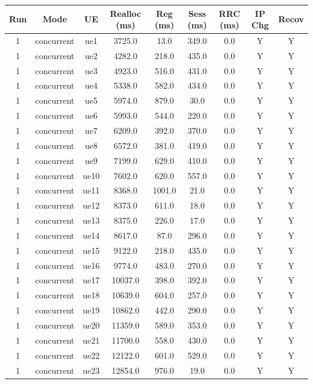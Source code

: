 \begin{table}[ht]
\centering
\begin{tabular}{|c|c|c|c|c|c|c|c|c|}
\hline
Run & Mode & UE & Realloc (ms) & Reg (ms) & Sess (ms) & RRC (ms) & IP Chg & Recov \\
\hline
1 & concurrent & ue1 & 3725.0 & 13.0 & 349.0 & 0.0 & Y & Y \\
1 & concurrent & ue2 & 4282.0 & 218.0 & 435.0 & 0.0 & Y & Y \\
1 & concurrent & ue3 & 4923.0 & 516.0 & 431.0 & 0.0 & Y & Y \\
1 & concurrent & ue4 & 5338.0 & 582.0 & 434.0 & 0.0 & Y & Y \\
1 & concurrent & ue5 & 5974.0 & 879.0 & 30.0 & 0.0 & Y & Y \\
1 & concurrent & ue6 & 5993.0 & 544.0 & 220.0 & 0.0 & Y & Y \\
1 & concurrent & ue7 & 6209.0 & 392.0 & 370.0 & 0.0 & Y & Y \\
1 & concurrent & ue8 & 6572.0 & 381.0 & 419.0 & 0.0 & Y & Y \\
1 & concurrent & ue9 & 7199.0 & 629.0 & 410.0 & 0.0 & Y & Y \\
1 & concurrent & ue10 & 7602.0 & 620.0 & 557.0 & 0.0 & Y & Y \\
1 & concurrent & ue11 & 8368.0 & 1001.0 & 21.0 & 0.0 & Y & Y \\
1 & concurrent & ue12 & 8373.0 & 611.0 & 18.0 & 0.0 & Y & Y \\
1 & concurrent & ue13 & 8375.0 & 226.0 & 17.0 & 0.0 & Y & Y \\
1 & concurrent & ue14 & 8617.0 & 87.0 & 296.0 & 0.0 & Y & Y \\
1 & concurrent & ue15 & 9122.0 & 218.0 & 435.0 & 0.0 & Y & Y \\
1 & concurrent & ue16 & 9774.0 & 483.0 & 270.0 & 0.0 & Y & Y \\
1 & concurrent & ue17 & 10037.0 & 398.0 & 392.0 & 0.0 & Y & Y \\
1 & concurrent & ue18 & 10639.0 & 604.0 & 257.0 & 0.0 & Y & Y \\
1 & concurrent & ue19 & 10862.0 & 442.0 & 290.0 & 0.0 & Y & Y \\
1 & concurrent & ue20 & 11359.0 & 589.0 & 353.0 & 0.0 & Y & Y \\
1 & concurrent & ue21 & 11700.0 & 558.0 & 430.0 & 0.0 & Y & Y \\
1 & concurrent & ue22 & 12122.0 & 601.0 & 529.0 & 0.0 & Y & Y \\
1 & concurrent & ue23 & 12854.0 & 976.0 & 19.0 & 0.0 & Y & Y \\

\end{tabular}
\end{table}
